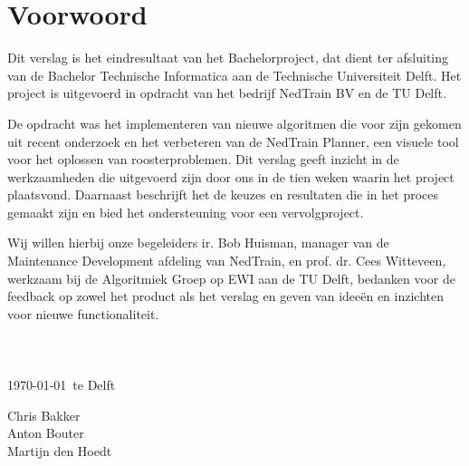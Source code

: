 \section*{Voorwoord}
Dit verslag is het eindresultaat van het Bachelorproject, dat dient ter afsluiting van de Bachelor Technische Informatica aan de Technische Universiteit Delft. Het project is uitgevoerd in opdracht van het bedrijf NedTrain BV en de TU Delft.

De opdracht was het implementeren van nieuwe algoritmen die voor zijn gekomen uit recent onderzoek en het verbeteren van de NedTrain Planner, een visuele tool voor het oplossen van roosterproblemen. Dit verslag geeft inzicht in de werkzaamheden die uitgevoerd zijn door ons in de tien weken waarin het project plaatsvond. Daarnaast beschrijft het de keuzes en resultaten die in het proces gemaakt zijn en bied het ondersteuning voor een vervolgproject.

Wij willen hierbij onze begeleiders ir. Bob Huisman, manager van de Maintenance Development afdeling van NedTrain, en prof. dr. Cees Witteveen, werkzaam bij de Algoritmiek Groep op EWI aan de TU Delft, bedanken voor de feedback op zowel het product als het verslag en geven van idee\"en en inzichten voor nieuwe functionaliteit. 
\\ \\ \\ \\
\today ~te Delft

Chris Bakker \\
Anton Bouter \\
Martijn den Hoedt
